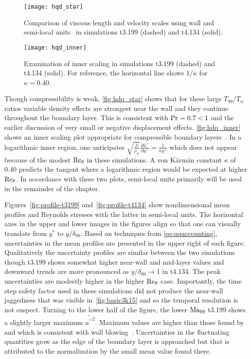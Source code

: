 \begin{figure}[p]
\centering
\texttt{[image: hqd\_star]}
\caption[Wall versus semi-local scaling for simulations t3.199 and t4.134]{%
    Comparison of viscous length and velocity scales using wall and
    semi-local units~\citep{Huang1995Compressible} in simulations t3.199
    (dashed) and t4.134 (solid).\label{fig:hdq_star}
}
\end{figure}

\begin{figure}
\centering
\texttt{[image: hqd\_inner]}
\caption[Examination of inner scaling in simulations t3.199 and t4.134]{%
    Examination of inner scaling in simulations t3.199
    (dashed) and t4.134 (solid).
    For
    reference, the horizontal line shows $1/\kappa$ for
    $\kappa=0.40$.\label{fig:hdq_inner}
}
\end{figure}

Though compressibility is weak, \autoref{fig:hdq_star} shows that for these
large $T_{99}/T_w$ ratios variable density effects are strongest near the wall and
they continue throughout the boundary layer.  This is consistent with
$\Prandtl{}=0.7<1$ and the earlier discussion of very small or negative
displacement effects.  \autoref{fig:hdq_inner} shows an inner scaling plot
appropriate for compressible boundary layers~\citep{Chassaing2010Variable}.  In
a logarithmic inner region, one anticipates $\sqrt{\frac{\bar{\rho}}{\rho_w}}
\frac{\partial{\bar{u}^{+}}}{\partial y^{+}} = \frac{1}{\kappa y^{+}}$ which
does not appear because of the modest $\Reynolds[\theta]{}$ in these
simulations.  A von K\'arm\'an constant $\kappa$ of 0.40 predicts the tangent
where a logarithmic region would be expected at higher $\Reynolds[\theta]{}$.
In accordance with these two plots, semi-local units primarily will be used in
the remainder of the chapter.

Figures~\ref{fig:profile-t3199} and~\ref{fig:profile-t4134} show
nondimensional mean profiles and Reynolds stresses with the latter in semi-local
units.  The horizontal axes in the upper and lower images in the figures align
so that one can visually translate from $y^\ast$ to $y/\delta_{99}$.  Based on
techniques from \autoref{eq:uqaccounting}, uncertainties in the mean profiles
are presented in the upper right of each figure.  Qualitatively the uncertainty
profiles are similar between the two simulations though t3.199 shows somewhat
higher near-wall and mid-layer values and downward trends are more pronounced as
$y/\delta_{99}\to{}1$ in t4.134.  The peak uncertainties are modestly higher in
the higher $\Reynolds[\theta]$ case.  Importantly, the time step safety factor used
in these simulations did not produce the near-wall jaggedness that was visible
in~\autoref{fig:basic3k15} and so the temporal resolution is not suspect.
Turning to the lower half of the figure, the lower $\Mach[99]{}$ t3.199 shows a
slightly larger maximum $\widetilde{{u^{\prime\prime}}^2}$.  Maximum values are
higher than those found by \citet[Figure 6]{Guarini2000Direct} and
\citet[Figure 18]{Coleman1995Numerical} which is consistent with wall
blowing~\citep{Sumitani1995Direct}.  Uncertainties in the fluctuating quantities
grow as the edge of the boundary layer is approached but that is attributed to
the normalization by the small mean value found there.

